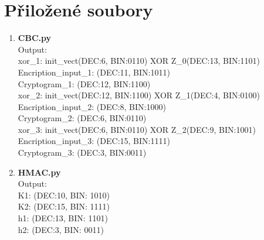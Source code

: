 \documentclass[10pt, a4paper]{article}%
\begin{document}
	\section*{\large{\textbf{Přiložené soubory}}}
	\begin{enumerate}
	\item \textbf{CBC.py}\\

	
	Output:\\
	xor\_1: init\_vect(DEC:6, BIN:0110) XOR Z\_0(DEC:13, BIN:1101)\\
	Encription\_input\_1: (DEC:11, BIN:1011)\\
	Cryptogram\_1: (DEC:12, BIN:1100)\\
	xor\_2: init\_vect(DEC:12, BIN:1100) XOR Z\_1(DEC:4, BIN:0100)\\
	Encription\_input\_2: (DEC:8, BIN:1000)\\
	Cryptogram\_2: (DEC:6, BIN:0110)\\
	xor\_3: init\_vect(DEC:6, BIN:0110) XOR Z\_2(DEC:9, BIN:1001)\\
	Encription\_input\_3: (DEC:15, BIN:1111)\\
	Cryptogram\_3: (DEC:3, BIN:0011)
	\clearpage
	\item \textbf{HMAC.py}\\
	
	Output:\\
	K1: (DEC:10, BIN: 1010)\\
	K2: (DEC:15, BIN: 1111)\\
	h1: (DEC:13, BIN: 1101)\\
	h2: (DEC:3, BIN: 0011)
\end{enumerate}
\end{document}

